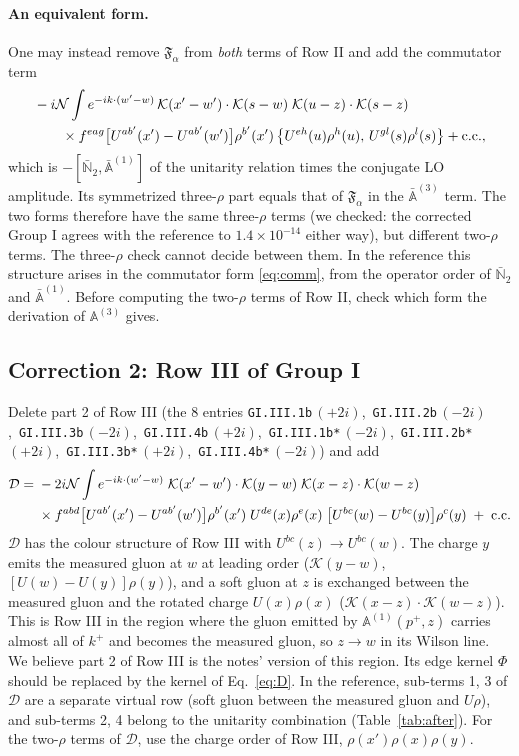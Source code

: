 \documentclass[10pt]{article}
\numberwithin{equation}{section}
\newcommand{\KK}{\mathcal K}
\newcommand{\NN}{\mathcal N}
\newcommand{\lab}[1]{\texttt{#1}}
\begin{document}
\paragraph{An equivalent form.} One may instead remove $\mathfrak F_\alpha$ from \emph{both} terms of Row II and add the commutator term
\begin{align}
&-i\NN\int e^{-ik\cdot(w'-w)}\,\KK(x'-w')\cdot\KK(s-w)\;\KK(u-z)\cdot\KK(s-z)\notag\\
&\qquad\times f^{eag}\big[U^{ab'}(x')-U^{ab'}(w')\big]\rho^{b'}(x')\,\big\{U^{eh}(u)\rho^h(u),\,U^{gl}(s)\rho^l(s)\big\}+{\rm c.c.},
\label{eq:comm}
\end{align}
which is $-[\bar{\mathbb N}_2,\bar{\mathbb A}^{(1)}]$ of the unitarity relation times the conjugate LO amplitude. Its symmetrized three-$\rho$ part equals that of $\mathfrak F_\alpha$ in the $\bar{\mathbb A}^{(3)}$ term. The two forms therefore have the same three-$\rho$ terms (we checked: the corrected Group I agrees with the reference to $1.4\times10^{-14}$ either way), but different two-$\rho$ terms. The three-$\rho$ check cannot decide between them. In the reference this structure arises in the commutator form \eqref{eq:comm}, from the operator order of $\bar{\mathbb N}_2$ and $\bar{\mathbb A}^{(1)}$. Before computing the two-$\rho$ terms of Row II, check which form the derivation of $\mathbb A^{(3)}$ gives.

\subsection{Correction 2: Row III of Group I}
Delete part 2 of Row III (the 8 entries \lab{GI.III.1b}\,$(+2i)$,\ \lab{GI.III.2b}\,$(-2i)$,\ \lab{GI.III.3b}\,$(-2i)$,\ \lab{GI.III.4b}\,$(+2i)$,\ \lab{GI.III.1b*}\,$(-2i)$,\ \lab{GI.III.2b*}\,$(+2i)$,\ \lab{GI.III.3b*}\,$(+2i)$,\ \lab{GI.III.4b*}\,$(-2i)$) and add
\begin{align}
\mathcal D={}&-2i\NN\int e^{-ik\cdot(w'-w)}\;\KK(x'-w')\cdot\KK(y-w)\;\KK(x-z)\cdot\KK(w-z)\notag\\
&\times f^{abd}\big[U^{ab'}(x')-U^{ab'}(w')\big]\rho^{b'}(x')\;U^{de}(x)\rho^e(x)\;\big[U^{bc}(w)-U^{bc}(y)\big]\rho^c(y)\;+\;{\rm c.c.}
\label{eq:D}
\end{align}
$\mathcal D$ has the colour structure of Row III with $U^{bc}(z)\to U^{bc}(w)$. The charge $y$ emits the measured gluon at $w$ at leading order ($\KK(y-w)$, $[U(w)-U(y)]\rho(y)$), and a soft gluon at $z$ is exchanged between the measured gluon and the rotated charge $U(x)\rho(x)$ ($\KK(x-z)\cdot\KK(w-z)$). This is Row III in the region where the gluon emitted by $\mathbb A^{(1)}(p^+,z)$ carries almost all of $k^+$ and becomes the measured gluon, so $z\to w$ in its Wilson line. We believe part 2 of Row III is the notes' version of this region. Its edge kernel $\Phi$ should be replaced by the kernel of Eq.~\eqref{eq:D}. In the reference, sub-terms 1, 3 of $\mathcal D$ are a separate virtual row (soft gluon between the measured gluon and $U\rho$), and sub-terms 2, 4 belong to the unitarity combination (Table~\ref{tab:after}). For the two-$\rho$ terms of $\mathcal D$, use the charge order of Row III, $\rho(x')\rho(x)\rho(y)$.
\end{document}
